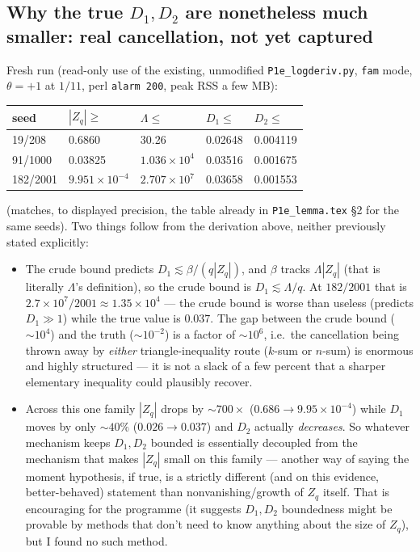 \documentclass[11pt]{article}
\theoremstyle{remark}\newtheorem{remark}[theorem]{Remark}
\begin{document}
\subsection{Why the true $D_1,D_2$ are nonetheless much smaller: real cancellation, not yet captured}
Fresh run (read-only use of the existing, unmodified \texttt{P1e\_logderiv.py}, \texttt{fam} mode, $\theta=+1$ at $1/11$, perl \texttt{alarm 200}, peak RSS a few MB):
\begin{center}\small\begin{tabular}{lllll}\toprule
seed & $|Z_q|\ge$ & $\Lambda\le$ & $D_1\le$ & $D_2\le$\\\midrule
19/208 & 0.6860 & 30.26 & 0.02648 & 0.004119\\
91/1000 & 0.03825 & $1.036\times10^4$ & 0.03516 & 0.001675\\
182/2001 & $9.951\times10^{-4}$ & $2.707\times10^7$ & 0.03658 & 0.001553\\\bottomrule
\end{tabular}\end{center}
(matches, to displayed precision, the table already in \texttt{P1e\_lemma.tex} \S2 for the same seeds). Two things follow from the derivation above, neither previously stated explicitly:
\begin{itemize}
\item The crude bound predicts $D_1\lesssim\beta/(q|Z_q|)$, and $\beta$ tracks $\Lambda|Z_q|$ (that is literally $\Lambda$'s definition), so the crude bound is $D_1\lesssim \Lambda/q$. At $182/2001$ that is $2.7\times10^7/2001\approx1.35\times10^4$ --- the crude bound is worse than useless (predicts $D_1\gg1$) while the true value is $0.037$. The gap between the crude bound ($\sim10^4$) and the truth ($\sim10^{-2}$) is a factor of $\sim10^6$, i.e.\ the cancellation being thrown away by \emph{either} triangle-inequality route ($k$-sum or $n$-sum) is enormous and highly structured --- it is not a slack of a few percent that a sharper elementary inequality could plausibly recover.
\item Across this one family $|Z_q|$ drops by $\sim700\times$ ($0.686\to9.95\times10^{-4}$) while $D_1$ moves by only $\sim40\%$ ($0.026\to0.037$) and $D_2$ actually \emph{decreases}. So whatever mechanism keeps $D_1,D_2$ bounded is essentially decoupled from the mechanism that makes $|Z_q|$ small on this family --- another way of saying the moment hypothesis, if true, is a strictly different (and on this evidence, better-behaved) statement than nonvanishing/growth of $Z_q$ itself. That is encouraging for the programme (it suggests $D_1,D_2$ boundedness might be provable by methods that don't need to know anything about the size of $Z_q$), but I found no such method.
\end{itemize}
\end{document}
